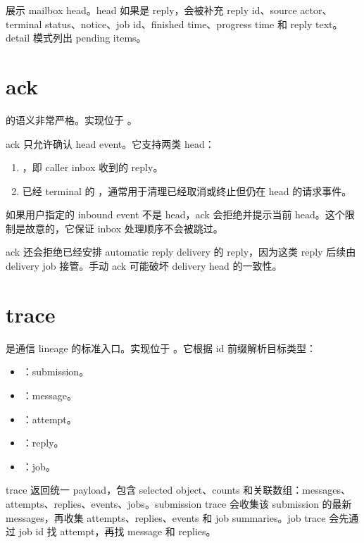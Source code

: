  展示 mailbox head。head 如果是 reply，会被补充 reply id、source actor、terminal status、notice、job id、finished time、progress time 和 reply text。detail 模式列出 pending items。

\section{ack}

 的语义非常严格。实现位于 。

ack 只允许确认 head event。它支持两类 head：

\begin{enumerate}
  \item {}，即 caller inbox 收到的 reply。
  \item 已经 terminal 的 ，通常用于清理已经取消或终止但仍在 head 的请求事件。
\end{enumerate}

如果用户指定的 inbound event 不是 head，ack 会拒绝并提示当前 head。这个限制是故意的，它保证 inbox 处理顺序不会被跳过。

ack 还会拒绝已经安排 automatic reply delivery 的 reply，因为这类 reply 后续由 delivery job 接管。手动 ack 可能破坏 delivery head 的一致性。

\section{trace}

 是通信 lineage 的标准入口。实现位于 。它根据 id 前缀解析目标类型：

\begin{itemize}
  \item {}：submission。
  \item {}：message。
  \item {}：attempt。
  \item {}：reply。
  \item {}：job。
\end{itemize}

trace 返回统一 payload，包含 selected object、counts 和关联数组：messages、attempts、replies、events、jobs。submission trace 会收集该 submission 的最新 messages，再收集 attempts、replies、events 和 job summaries。job trace 会先通过 job id 找 attempt，再找 message 和 replies。

